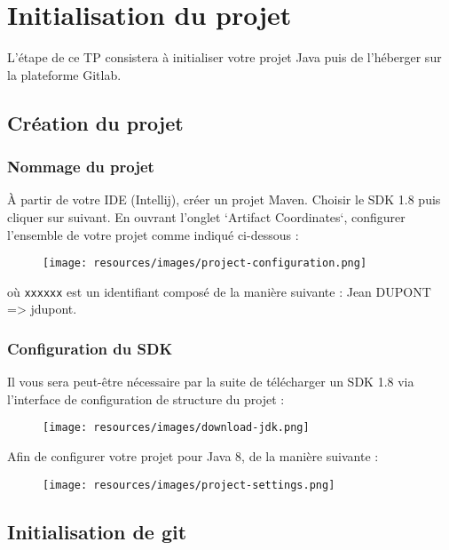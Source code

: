 \documentclass[11pt,a4paper,oneside]{article}
\begin{document}
\section{Initialisation du projet}

L'étape de ce TP consistera à initialiser votre projet Java puis de l'héberger sur la plateforme Gitlab.

\subsection{Création du projet}

\subsubsection{Nommage du projet}
À partir de votre IDE (Intellij), créer un projet Maven. Choisir le SDK 1.8 puis cliquer sur suivant. En ouvrant l'onglet `Artifact Coordinates`, configurer l'ensemble de votre projet comme indiqué ci-dessous :

\begin{figure}[h]
	\centering
	\texttt{[image: resources/images/project-configuration.png]}
\end{figure}

où \texttt{xxxxxx} est un identifiant composé de la manière suivante : Jean DUPONT => jdupont.

\subsubsection{Configuration du SDK}
\vspace{5mm}
Il vous sera peut-être nécessaire par la suite de télécharger un SDK 1.8 via l'interface de configuration de structure du projet :

\begin{figure}[h]
	\centering
	\texttt{[image: resources/images/download-jdk.png]}
\end{figure}

\vspace{5mm}
Afin de configurer votre projet pour Java 8, de la manière suivante :

\begin{figure}[h]
	\centering
	\texttt{[image: resources/images/project-settings.png]}
\end{figure}

\subsection{Initialisation de git}
\end{document}
